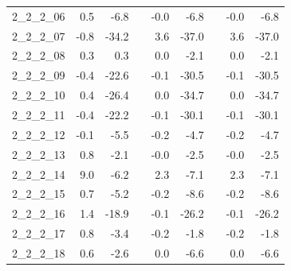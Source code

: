 \begin{longtable}{lrrcrrcrr}
2\_2\_2\_06      &                 0.5 &                  -6.8 &&                 -0.0 &                   -6.8 &&                 -0.0 &                   -6.8 \\
2\_2\_2\_07      &                -0.8 &                 -34.2 &&                  3.6 &                  -37.0 &&                  3.6 &                  -37.0 \\
2\_2\_2\_08      &                 0.3 &                   0.3 &&                  0.0 &                   -2.1 &&                  0.0 &                   -2.1 \\
2\_2\_2\_09      &                -0.4 &                 -22.6 &&                 -0.1 &                  -30.5 &&                 -0.1 &                  -30.5 \\
2\_2\_2\_10      &                 0.4 &                 -26.4 &&                  0.0 &                  -34.7 &&                  0.0 &                  -34.7 \\
2\_2\_2\_11      &                -0.4 &                 -22.2 &&                 -0.1 &                  -30.1 &&                 -0.1 &                  -30.1 \\
2\_2\_2\_12      &                -0.1 &                  -5.5 &&                 -0.2 &                   -4.7 &&                 -0.2 &                   -4.7 \\
2\_2\_2\_13      &                 0.8 &                  -2.1 &&                 -0.0 &                   -2.5 &&                 -0.0 &                   -2.5 \\
2\_2\_2\_14      &                 9.0 &                  -6.2 &&                  2.3 &                   -7.1 &&                  2.3 &                   -7.1 \\
2\_2\_2\_15      &                 0.7 &                  -5.2 &&                 -0.2 &                   -8.6 &&                 -0.2 &                   -8.6 \\
2\_2\_2\_16      &                 1.4 &                 -18.9 &&                 -0.1 &                  -26.2 &&                 -0.1 &                  -26.2 \\
2\_2\_2\_17      &                 0.8 &                  -3.4 &&                 -0.2 &                   -1.8 &&                 -0.2 &                   -1.8 \\
2\_2\_2\_18      &                 0.6 &                  -2.6 &&                  0.0 &                   -6.6 &&                  0.0 &                   -6.6 \\

\end{longtable}

